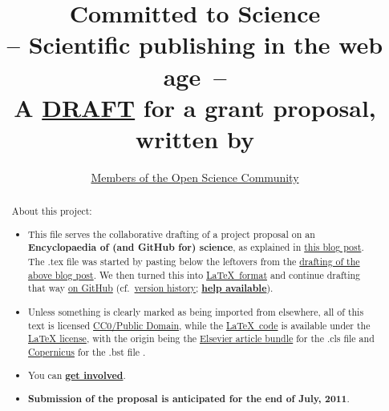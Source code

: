 \documentclass[final,authoryear,3p]{elsarticle-open-drafting}
\begin{document}
\begin{frontmatter}
	\title{{\LARGE \bf Committed to Science}\\-- Scientific publishing in the web age~--\\ A  \href{http://en.wikiversity.org/wiki/User:OpenScientist/Open_grant_writing_-_Encyclopaedia_of_original_research}{DRAFT} for a grant proposal,\\ written by}
	\author{\href{https://github.com/Daniel-Mietchen/Open-Research-Proposals/graphs/impact}{Members of the Open Science Community}}
	\begin{abstract}
		About this project:
		\begin{itemize}
			\item This file serves the collaborative drafting of a project proposal on an\\ 
			{\bf Encyclopaedia of (and GitHub for) science}, 
			as explained in \href{http://www.science3point0.com/evomri/2011/05/03/drafting-proposals-in-the-open-sketching-out-project-ideas/}{this blog post}. The .tex file was started by pasting below the leftovers from the \href{http://species-id.net/w/index.php?title=Draft:Encyclopaedia_of_original_research&oldid=5524}{drafting of the above blog post}. We then turned this into \href{http://en.wikibooks.org/wiki/LaTeX}{ \LaTeX~format} and continue drafting that way \href{https://github.com/Daniel-Mietchen/Open-Research-Proposals/commits/master}{on GitHub} (cf.\ \href{https://github.com/Daniel-Mietchen/Open-Research-Proposals/commits/master}{version history}; {\bf \href{http://help.github.com/}{help available}}).
			\item Unless something is clearly marked as being imported from elsewhere, all of this text is licensed 
			\href{http://creativecommons.org/publicdomain/zero/1.0/}{CC0/Public Domain}, 
			while the \href{https://github.com/Daniel-Mietchen/Open-Research-Proposals/blob/master/open-drafting.tex}{\LaTeX~code} 
			is available under the \href{http://www.latex-project.org/lppl.txt }{LaTeX license}, with the origin being the \href{http://www.elsevier.com/wps/find/authorsview.authors/elsarticle}{Elsevier article bundle} for the .cls file and \href{http://www.earth-system-science-data.net/Copernicus.bst}{Copernicus} for the .bst file . 
			
			\item You can {\bf \href{http://en.wikiversity.org/wiki/User:OpenScientist/Open_grant_writing_-_Encyclopaedia_of_original_research}{get involved}}.
			
			\item {\bf Submission of the proposal is anticipated for the end of July, 2011}.


\end{itemize}
\end{abstract}
\end{frontmatter}
\end{document}
